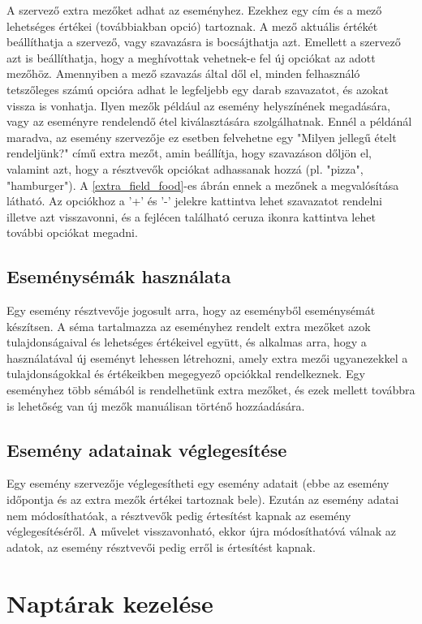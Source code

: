 \documentclass[a4paper,12pt]{report}
\theoremstyle{definition}
\theoremstyle{remark}
\begin{document}
A szervező extra mezőket adhat az eseményhez. Ezekhez egy cím és a mező lehetséges értékei (továbbiakban opció) tartoznak. A mező aktuális értékét beállíthatja a szervező, vagy szavazásra is bocsájthatja azt. Emellett a szervező azt is beállíthatja, hogy a meghívottak vehetnek-e fel új opciókat az adott mezőhöz. Amennyiben a mező szavazás által dől el, minden felhasználó tetszőleges számú opcióra adhat le legfeljebb egy darab szavazatot, és azokat vissza is vonhatja. Ilyen mezők például az esemény helyszínének megadására, vagy az eseményre rendelendő étel kiválasztására szolgálhatnak. Ennél a példánál maradva, az esemény szervezője ez esetben felvehetne egy "Milyen jellegű ételt rendeljünk?" című extra mezőt, amin beállítja, hogy szavazáson dőljön el, valamint azt, hogy a résztvevők opciókat adhassanak hozzá (pl. "pizza", "hamburger").  A \ref{extra_field_food}-es ábrán ennek a mezőnek a megvalósítása látható. Az opciókhoz a '+' és '-' jelekre kattintva lehet szavazatot rendelni illetve azt visszavonni, és a fejlécen található ceruza ikonra kattintva lehet további opciókat megadni.

	\subsection{Eseménysémák használata}

Egy esemény résztvevője jogosult arra, hogy az eseményből eseménysémát készítsen. A séma tartalmazza az eseményhez rendelt extra mezőket azok tulajdonságaival és lehetséges értékeivel együtt, és alkalmas arra, hogy a használatával új eseményt lehessen létrehozni, amely extra mezői ugyanezekkel a tulajdonságokkal és értékeikben megegyező opciókkal rendelkeznek. Egy eseményhez több sémából is rendelhetünk extra mezőket, és ezek mellett továbbra is lehetőség van új mezők manuálisan történő hozzáadására.

	\subsection{Esemény adatainak véglegesítése}

Egy esemény szervezője véglegesítheti egy esemény adatait (ebbe az esemény időpontja és az extra mezők értékei tartoznak bele).  Ezután az esemény adatai nem módosíthatóak, a résztvevők pedig értesítést kapnak az esemény véglegesítéséről. A művelet visszavonható, ekkor újra módosíthatóvá válnak az adatok, az esemény résztvevői pedig erről is értesítést kapnak.

\section{Naptárak kezelése}
\end{document}
